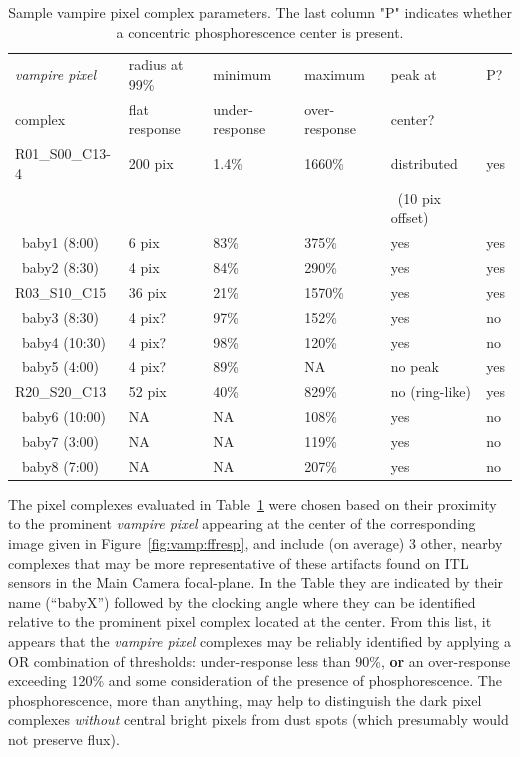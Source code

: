 \begin{table}[ht!]
\caption{Sample vampire pixel complex parameters. The last column "P" indicates whether a concentric phosphorescence center is present.}
\label{tab:vamp:samples}
\centering
\begin{tabular}{llllll}
\toprule
{\it vampire pixel}& radius at 99\% & minimum& maximum& peak at & P?\\
complex & flat response & under-response & over-response & center?\\
\midrule
R01\_S00\_C13-4 & 200 pix & 1.4\%&1660\% & distributed & yes\\
                &         &      &       &~(10 pix offset)&\\
~baby1 (8:00)   & 6 pix   & 83\% & 375\% & yes & yes \\
~baby2 (8:30)   & 4 pix   & 84\% & 290\% & yes & yes \\
R03\_S10\_C15   & 36 pix  & 21\% & 1570\%& yes & yes \\
~baby3 (8:30)   & 4 pix?  & 97\% & 152\% & yes & no \\
~baby4 (10:30)  & 4 pix?  & 98\% & 120\% & yes & no \\
~baby5 (4:00)   & 4 pix?  & 89\% & NA    & no peak & yes \\
R20\_S20\_C13   & 52 pix  & 40\% & 829\% & no (ring-like) & yes \\
~baby6 (10:00)  & NA      & NA   & 108\% & yes & no \\
~baby7 (3:00)   & NA      & NA   & 119\% & yes & no \\
~baby8 (7:00)   & NA      & NA   & 207\% & yes & no \\
\bottomrule
\end{tabular}
\end{table}


The pixel complexes evaluated in Table~\ref{tab:vamp:samples} were chosen based on their proximity to the prominent {\it vampire pixel} appearing at the center of the corresponding image given in Figure~\ref{fig:vamp:ffresp}, and include (on average) 3 other, nearby complexes that may be more representative of these artifacts found on ITL sensors in the Main Camera focal-plane. In the Table they are indicated by their name (``babyX'') followed by the clocking angle where they can be identified relative to the prominent pixel complex located at the center. From this list, it appears that the {\it vampire pixel} complexes may be reliably identified by applying a OR combination of thresholds: under-response less than 90\%, {\bf or} an over-response exceeding 120\% and some consideration of the presence of phosphorescence. The phosphorescence, more than anything, may help to distinguish the dark pixel complexes {\it without} central bright pixels from dust spots (which presumably would not preserve flux).

